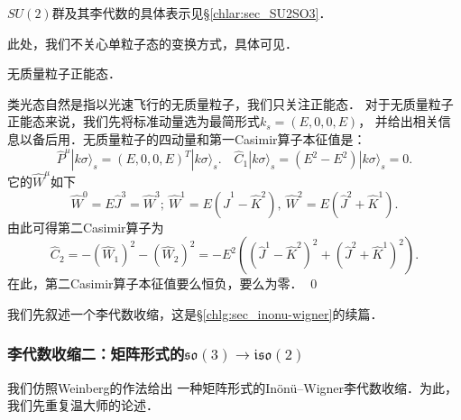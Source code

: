 $SU(2)$群及其李代数的具体表示见\S\ref{chlar:sec_SU2SO3}．

此处，我们不关心单粒子态的变换方式，具体可见\parencite[\S 2.5]{weinberg_vol1}．

\begin{example}
	无质量粒子正能态．
\end{example}
类光态自然是指以光速飞行的无质量粒子，我们只关注正能态．
对于无质量粒子正能态来说，我们先将标准动量选为最简形式$k_s=(E,0,0,E)$，
并给出相关信息以备后用．无质量粒子的四动量和第一Casimir算子本征值是：
\begin{equation}
	\hat{P}^\mu |k\sigma\rangle_s = (E,0,0,E)^T |k\sigma\rangle_s.    \quad
	\hat{C}_1 |k\sigma\rangle_s =(E^2-E^2) |k\sigma\rangle_s=0.
\end{equation}
它的$\hat{W}^\mu$如下
\begin{equation}\label{chlar:eqn_0W}
	\hat{W}^0 = E \hat{J}^3 = \hat{W}^3;\
	\hat{W}^1 = E \left( {\hat{J}}^1 -{\hat{K}}^2 \right), \ 
	\hat{W}^2 = E \left( {\hat{J}}^2 +{\hat{K}}^1 \right).
\end{equation}
由此可得第二Casimir算子为
\begin{equation}\label{chlar:eqn_C2-massless}
	\hat{C}_2 = -(\hat{W}_1)^2-(\hat{W}_2)^2
	=-E^2\left( \left( {\hat{J}}^1- {\hat{K}}^2  \right)^2 + 
	\left( {\hat{J}}^2 +{\hat{K}}^1 \right)^2\right) .
\end{equation}
在此，第二Casimir算子本征值要么恒负，要么为零．
\qed




我们先叙述一个李代数收缩，这是\S\ref{chlg:sec_inonu-wigner}的续篇．




\subsubsection{李代数收缩二：矩阵形式的$\mathfrak{so}(3)\to \mathfrak{iso}(2)$}\label{chlar:sec_so2iso}

我们\cite{liu_ge-2014}仿照Weinberg的作法给出
一种矩阵形式的In\"on\"u--Wigner李代数收缩．为此，我们先重复温大师的论述．

